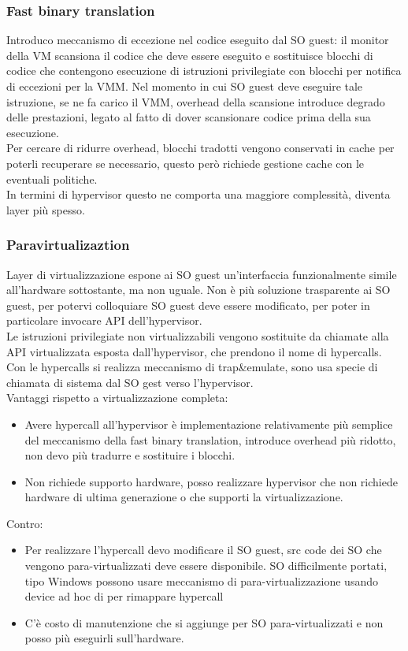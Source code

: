 \documentclass[16px]{article}
\begin{document}
\subsubsection{Fast binary translation}
Introduco meccanismo di eccezione nel codice eseguito dal SO guest: il monitor della VM scansiona il codice che deve essere eseguito e sostituisce blocchi di codice che contengono esecuzione di istruzioni privilegiate con blocchi per notifica di eccezioni per la VMM. Nel momento in cui SO guest deve eseguire tale istruzione, se ne fa carico il VMM, overhead della scansione introduce degrado delle prestazioni, legato al fatto di dover scansionare codice prima della sua esecuzione.\\ Per cercare di ridurre overhead, blocchi tradotti vengono conservati in cache per poterli recuperare se necessario, questo però richiede gestione cache con le eventuali politiche.\\ In termini di hypervisor questo ne comporta una maggiore complessità, diventa layer più spesso.
\subsubsection{Paravirtualizaztion}
Layer di virtualizzazione espone ai SO guest un'interfaccia funzionalmente simile all'hardware sottostante, ma non uguale. Non è più soluzione trasparente ai SO guest, per potervi colloquiare SO guest deve essere modificato, per poter in particolare invocare API dell'hypervisor.\\ Le istruzioni privilegiate non virtualizzabili vengono sostituite da chiamate alla API virtualizzata esposta dall'hypervisor, che prendono il nome di hypercalls.\\ Con le hypercalls si realizza meccanismo di trap\&emulate, sono usa specie di chiamata di sistema dal SO gest verso l'hypervisor.\\ Vantaggi rispetto a virtualizzazione completa:
\begin{itemize}
\item Avere hypercall all'hypervisor è implementazione relativamente più semplice del meccanismo della fast binary translation, introduce overhead più ridotto, non devo più tradurre e sostituire i blocchi.
\item Non richiede supporto hardware, posso realizzare hypervisor che non richiede hardware di ultima generazione o che supporti la virtualizzazione.
\end{itemize}
Contro:
\begin{itemize}
\item Per realizzare l'hypercall devo modificare il SO guest, src code dei SO che vengono para-virtualizzati  deve essere disponibile. SO difficilmente portati, tipo Windows possono usare meccanismo di para-virtualizzazione usando device ad hoc di per rimappare hypercall
\item C'è costo di manutenzione che si aggiunge per SO para-virtualizzati e non posso più eseguirli sull'hardware.
\end{itemize}
\end{document}
